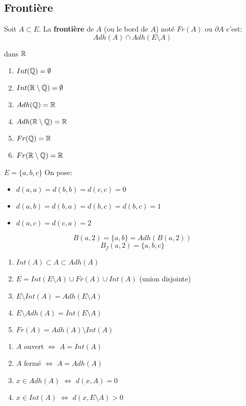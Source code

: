 \subsection{Frontière}
 \begin{definition}
     Soit $A \subset E$. La \textbf{frontière} de $A$ (ou le bord de $A$) noté $Fr(A)$ ou  $\partial A$ c'est:
      \[
     Adh(A) \cap Adh(E \setminus A)
     \] 
 \end{definition}
 \begin{eg} dans $\mathbb{R}$
    \begin{enumerate}
        \item $Int(\mathbb{Q}) = \emptyset$
        \item $Int(\mathbb{R} \setminus \mathbb{Q}) = \emptyset$
        \item $Adh(\mathbb{Q}) = \mathbb{R}$
        \item $Adh(\mathbb{R} \setminus \mathbb{Q}) = \mathbb{R}$
        \item $Fr(\mathbb{Q}) = \mathbb{R}$
        \item $Fr(\mathbb{R} \setminus \mathbb{Q}) = \mathbb{R}$
    \end{enumerate} 
 \end{eg}
 \begin{eg} $E = \{a, b, c\}$
    On pose:
    \begin{itemize}
        \item $d(a,a) = d(b,b) = d(c,c) = 0$
        \item  $d(a,b) = d(b,a) = d(b,c) = d(b,c) = 1$
        \item  $d(a,c) = d(c, a) = 2$
    \end{itemize}
    \[
        B(a,2) = \{a, b\} = Adh(B(a, 2))
    \] 
    \[
        B_f(a, 2) = \{a, b, c\}
    \] 
 \end{eg}
 \begin{prop}
    \begin{enumerate}
        \item $Int(A) \subset A \subset Adh(A)$
        \item $E = Int(E \setminus A) \cup Fr(A) \cup Int(A)$ (union disjointe)
        \item $E \setminus Int(A) = Adh(E \setminus A)$
        \item $E \setminus Adh(A) = Int(E \setminus A)$
        \item $Fr(A) = Adh(A) \setminus Int(A)$
    \end{enumerate} 
 \end{prop}
 \begin{prop}
     \begin{enumerate}
         \item $A$ ouvert  $\iff$ $A = Int(A)$
         \item  $A$ fermé  $\iff$ $A = Adh(A)$
         \item  $x \in Adh(A)$  $\iff$ $d(x, A) = 0$
         \item  $x \in Int(A)$  $\iff$ $d(x, E \setminus A) > 0$
     \end{enumerate}
 \end{prop}

